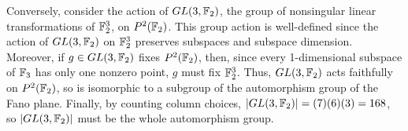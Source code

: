 \documentclass{article}
\begin{document}
Conversely, consider the action of $GL(3, \mathbb{F}_2)$, the group of nonsingular linear transformations of $\mathbb{F}_2^3$, on $P^2(\mathbb{F}_2)$. This group action is well-defined since the action of $GL(3, \mathbb{F}_2)$  on $\mathbb{F}_2^3$ preserves subspaces and subspace dimension.  Moreover, if $g \in GL(3, \mathbb{F}_2)$ fixes $P^2(\mathbb{F}_2)$, then, since every 1-dimensional subspace of $\mathbb{F}_3$ has only one nonzero point, $g$ must fix $\mathbb{F}_2^3$. Thus, $GL(3, \mathbb{F}_2)$ acts faithfully on $P^2(\mathbb{F}_2)$, so is isomorphic to a subgroup of the automorphism group of the Fano plane.   Finally, by counting column choices, $|GL(3, \mathbb{F}_2)| = (7)(6)(3) = 168$, so $|GL(3, \mathbb{F}_2)|$ must be the whole automorphism group.



\end{document}
